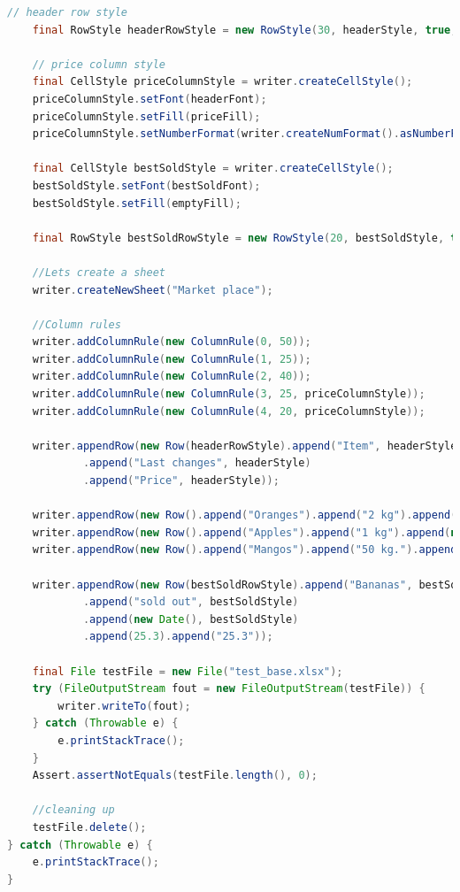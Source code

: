 \documentclass[14pt]{matmex-diploma}
\begin{document}
\begin{lstlisting}[language=Java, style=basic, caption={Пример создания документа XLSX с форматированием с помощью библиотеки oxml-doc}, captionpos=b, label=java2]
    // header row style
    final RowStyle headerRowStyle = new RowStyle(30, headerStyle, true, true);

    // price column style
    final CellStyle priceColumnStyle = writer.createCellStyle();
    priceColumnStyle.setFont(headerFont);
    priceColumnStyle.setFill(priceFill);
    priceColumnStyle.setNumberFormat(writer.createNumFormat().asNumberFmt(2));

    final CellStyle bestSoldStyle = writer.createCellStyle();
    bestSoldStyle.setFont(bestSoldFont);
    bestSoldStyle.setFill(emptyFill);

    final RowStyle bestSoldRowStyle = new RowStyle(20, bestSoldStyle, true, true);
    
    //Lets create a sheet
    writer.createNewSheet("Market place");
    
    //Column rules
    writer.addColumnRule(new ColumnRule(0, 50));
    writer.addColumnRule(new ColumnRule(1, 25));
    writer.addColumnRule(new ColumnRule(2, 40));
    writer.addColumnRule(new ColumnRule(3, 25, priceColumnStyle));
    writer.addColumnRule(new ColumnRule(4, 20, priceColumnStyle));
    
    writer.appendRow(new Row(headerRowStyle).append("Item", headerStyle).append("Count", headerStyle)
            .append("Last changes", headerStyle)
            .append("Price", headerStyle));

    writer.appendRow(new Row().append("Oranges").append("2 kg").append(new Date()).append(10).append("10.0"));
    writer.appendRow(new Row().append("Apples").append("1 kg").append(new Date()).append(20).append("20.0"));
    writer.appendRow(new Row().append("Mangos").append("50 kg.").append(new Date()).append(30).append("30.0"));

    writer.appendRow(new Row(bestSoldRowStyle).append("Bananas", bestSoldStyle)
            .append("sold out", bestSoldStyle)
            .append(new Date(), bestSoldStyle)
            .append(25.3).append("25.3"));

    final File testFile = new File("test_base.xlsx");
    try (FileOutputStream fout = new FileOutputStream(testFile)) {
        writer.writeTo(fout);
    } catch (Throwable e) {
        e.printStackTrace();
    }
    Assert.assertNotEquals(testFile.length(), 0);

    //cleaning up
    testFile.delete();
} catch (Throwable e) {
    e.printStackTrace();
}
\end{lstlisting}
\setmonofont[Mapping=tex-text]{CMU Typewriter Text}


\end{document}
